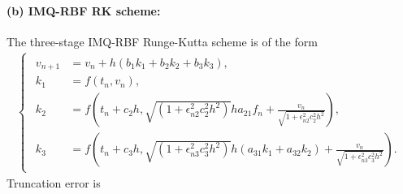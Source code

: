 \documentclass[a4paper, preprint,11pt]{elsarticle}
\numberwithin{equation}{section}
\begin{document}
\paragraph{(b) IMQ-RBF RK scheme:} The three-stage IMQ-RBF Runge-Kutta scheme is of the form
\begin{eqnarray}    \label{eq:imq3}  
\begin{cases}
\begin{aligned}
v_{n+1} & = v_n + h(b_1 k_1 + b_2 k_2 + b_3 k_3),\\
k_1 &= f(t_n, v_n), \\
k_2 &= f\left(t_n + c_2 h, \sqrt{(1 + \epsilon_{n2}^2 c_{2}^2 h^2)}ha_{21} f_n + \frac{v_n} {\sqrt{1 + \epsilon_{n2}^2 c_{2}^2 h^2}}\right),\\
k_3 &= f\left(t_n + c_3 h, \sqrt{(1 + \epsilon_{n3}^2 c_{3}^2 h^2)}h (a_{31}k_1 + a_{32}k_2)+ \frac{v_n} {\sqrt{1 + \epsilon_{n3}^2 c_{3}^2 h^2}}\right). 
\end{aligned}    
\end{cases}    
\end{eqnarray}
Truncation error is 
\end{document}
